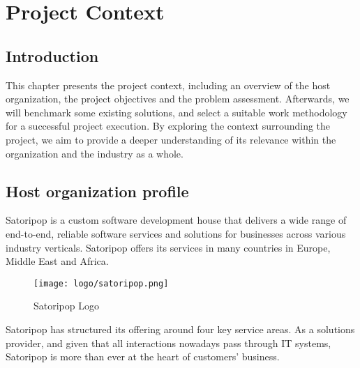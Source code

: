 \chapter{Project Context}
\section*{Introduction}
This chapter presents the project context, including an overview of the host organization,
the project objectives and the problem assessment. Afterwards, we will benchmark some existing
solutions, and select a suitable work methodology for a successful project execution.
By exploring the context surrounding the project, we aim to provide a deeper understanding of
its relevance within the organization and the industry as a whole.

\section{Host organization profile}

Satoripop is a custom software development house that delivers a wide range of end-to-end,
reliable software services and solutions for businesses across various industry verticals.
Satoripop offers its services in many countries in Europe, Middle East and Africa.

\begin{figure}[hbt!]
    \centering
    \texttt{[image: logo/satoripop.png]}
    \caption{Satoripop Logo}
    \label{fig:sp-logo}
\end{figure}

Satoripop has structured its offering around four key service areas. As a solutions provider,
and given that all interactions nowadays pass through IT systems, Satoripop is more than ever at the
heart of customers' business.

